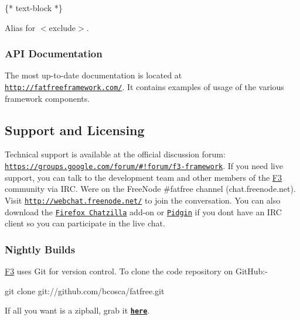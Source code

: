 \begin{DoxyCode}
\{* text-block *\}
\end{DoxyCode}

\begin{DoxyItemize}
\item Alias for {\ttfamily $<$exclude$>$}.
\end{DoxyItemize}

\subsubsection*{A\+PI Documentation}

The most up-\/to-\/date documentation is located at \href{http://fatfreeframework.com/}{\tt http\+://fatfreeframework.\+com/}. It contains examples of usage of the various framework components.

\subsection*{Support and Licensing}

Technical support is available at the official discussion forum\+: \href{https://groups.google.com/forum/#!forum/f3-framework}{\tt {\ttfamily https\+://groups.\+google.\+com/forum/\#!forum/f3-\/framework}}. If you need live support, you can talk to the development team and other members of the \hyperlink{class_f3}{F3} community via I\+RC. We\textquotesingle{}re on the Free\+Node {\ttfamily \#fatfree} channel ({\ttfamily chat.\+freenode.\+net}). Visit \href{http://webchat.freenode.net/}{\tt {\ttfamily http\+://webchat.\+freenode.\+net/}} to join the conversation. You can also download the \href{https://addons.mozilla.org/en-US/firefox/addon/chatzilla/}{\tt Firefox Chatzilla} add-\/on or \href{http://www.pidgin.im/}{\tt Pidgin} if you don\textquotesingle{}t have an I\+RC client so you can participate in the live chat.

\subsubsection*{Nightly Builds}

\hyperlink{class_f3}{F3} uses Git for version control. To clone the code repository on Git\+Hub\+:-\/


\begin{DoxyCode}
git clone git://github.com/bcosca/fatfree.git
\end{DoxyCode}


If all you want is a zipball, grab it \href{https://github.com/bcosca/fatfree/archive/dev.zip}{\tt {\bfseries here}}.

